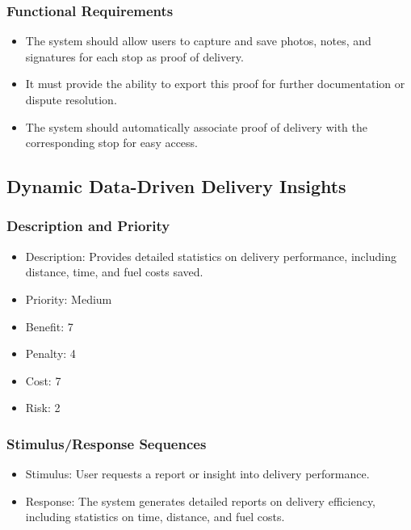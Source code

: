 \subsubsection{Functional Requirements}

\begin{itemize}
    \item The system should allow users to capture and save photos, notes, and signatures for each stop as proof of delivery.
    \item It must provide the ability to export this proof for further documentation or dispute resolution.
    \item The system should automatically associate proof of delivery with the corresponding stop for easy access.
\end{itemize}

\subsection{Dynamic Data-Driven Delivery Insights}
\subsubsection{Description and Priority}

\begin{itemize}
    \item Description: Provides detailed statistics on delivery performance, including distance, time, and fuel costs saved.
    \item Priority: Medium
    \item Benefit: 7
    \item Penalty: 4
    \item Cost: 7
    \item Risk: 2
\end{itemize}

\subsubsection{Stimulus/Response Sequences}

\begin{itemize}
    \item Stimulus: User requests a report or insight into delivery performance.
    \item Response: The system generates detailed reports on delivery efficiency, including statistics on time, distance, and fuel costs.
\end{itemize}

